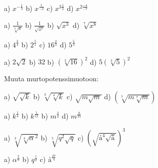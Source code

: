 \begin{tehtava}
a) $x^{-\frac{1}{3}}$ \qquad
b) $x^\frac{5}{-2}$ \qquad
c) $x^{3 \frac{1}{2}}$ \qquad
d) $x^{2 \frac{-4}{-7}}$ \qquad
\begin{vastaus}	
a) $\frac{1}{\sqrt[3]{x}}$ \qquad
b) $\frac{1}{\sqrt{x^5}}$ \qquad
b) $\sqrt{x^3}$ \qquad
d) $\sqrt[7]{x^8}$ 
\end{vastaus}
\end{tehtava}

\begin{tehtava}
a) $4^\frac{3}{4}$ \qquad
b) $2^\frac{5}{1}$ \qquad
c) $16^\frac{2}{3}$ \qquad
d) $5^\frac{5}{3}$ \qquad
\begin{vastaus}	
a) $2\sqrt{2}$ \qquad
b) $32$ \qquad
b) $(\sqrt[3]{16})^2$ \qquad
d) $5(\sqrt[3]{5})^2$ 
\end{vastaus}
\end{tehtava}

Muuta murtopotenssimuotoon:

\begin{tehtava}
a) $\sqrt{\sqrt{k}}$ \qquad
b) $\sqrt[3]{\sqrt[4]{k}}$ \qquad
c) $\sqrt{m\sqrt{m}}$ \qquad
d) $(\sqrt[5]{m\sqrt[7]{m}})$ \qquad
\begin{vastaus}	
a) $k^\frac{1}{4}$ \qquad
b) $k^\frac{1}{12}$ \qquad
b) $m^\frac{3}{4}$ \qquad
d) $m^\frac{8}{35}$ 
\end{vastaus}
\end{tehtava}

\begin{tehtava}
a) $\sqrt[3]{\sqrt[3]{\alpha}^2}$ \qquad
b) $\sqrt[5]{q^2\sqrt{q}}$ \qquad
c) $(\sqrt{å^4\sqrt{å}})^3$ \qquad
\begin{vastaus}	
a) $\alpha^\frac{2}{9}$ \qquad
b) $q^\frac{1}{2}$ \qquad
c) $å^\frac{27}{4}$
\end{vastaus}
\end{tehtava}

